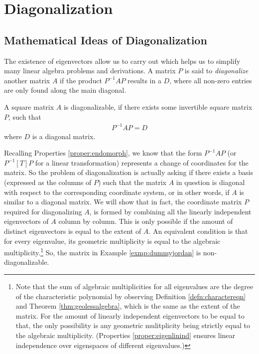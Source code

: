 \section{Diagonalization}

\subsection{Mathematical Ideas of Diagonalization}
\label{section:diagonalizeidea}
The existence of eigenvectors allow us to carry out  which helps us to simplify many linear algebra problems and derivations. A matrix $P$ is said to \textit{diagonalize} another matrix $A$ if the product $P^{-1}AP$ results in a  $D$, where all non-zero entries are only found along the main diagonal.
\begin{defn}[Diagonalization]
A square matrix $A$ is diagonalizable, if there exists some invertible square matrix $P$, such that
\begin{align*}
P^{-1}AP = D
\end{align*}
where $D$ is a diagonal matrix.
\end{defn}
Recalling Properties \ref{proper:endomorph}, we know that the form $P^{-1}AP$ (or $P^{-1}[T]P$ for a linear transformation) represents a change of coordinates for the matrix. So the problem of diagonalization is actually asking if there exists a basis (expressed as the columns of $P$) such that the matrix $A$ in question is diagonal with respect to the corresponding coordinate system, or in other words, if $A$ is similar to a diagonal matrix. We will show that in fact, the coordinate matrix $P$ required for diagonalizing $A$, is formed by combining all the linearly independent eigenvectors of $A$ column by column. This is only possible if the amount of distinct eigenvectors is equal to the extent of $A$. An equivalent condition is that for every eigenvalue, its geometric multiplicity is equal to the algebraic multiplicity.\footnote{\label{foot:algequalgeo}Note that the sum of algebraic multiplicities for all eigenvalues are the degree of the characteristic polynomial by observing Definition \ref{defn:charactereqn} and Theorem \ref{thm:geolessalgebra}, which is the same as the extent of the matrix. For the amount of linearly independent eigenvectors to be equal to that, the only possibility is any geometric mulitplicity being strictly equal to the algebraic multiplicity. (Properties \ref{proper:eigenlinind} ensures linear independence over eigenspaces of different eigenvalues.)} So, the matrix in Example \ref{exmp:dummyjordan} is non-diagonalizable. 
